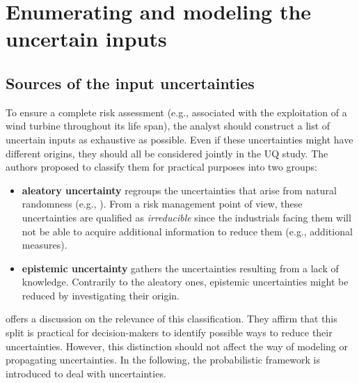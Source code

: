 \section{Enumerating and modeling the uncertain inputs}

\subsection{Sources of the input uncertainties}

To ensure a complete risk assessment (e.g., associated with the exploitation of a wind turbine throughout its life span), the analyst should construct a list of uncertain inputs as exhaustive as possible. 
Even if these uncertainties might have different origins, they should all be considered jointly in the UQ study. 
The authors proposed to classify them for practical purposes into two groups:
\begin{itemize}
    \item \textbf{aleatory uncertainty} regroups the uncertainties that arise from natural randomness (e.g., ). 
    From a risk management point of view, these uncertainties are qualified as \textit{irreducible} since the industrials facing them will not be able to acquire additional information to reduce them (e.g., additional measures).     
    \item \textbf{epistemic uncertainty} gathers the uncertainties resulting from a lack of knowledge. 
    Contrarily to the aleatory ones, epistemic uncertainties might be reduced by investigating their origin. 
\end{itemize} 

\citet{kiureghian_2009} offers a discussion on the relevance of this classification. 
They affirm that this split is practical for decision-makers to identify possible ways to reduce their uncertainties. 
However, this distinction should not affect the way of modeling or propagating uncertainties. 
In the following, the probabilistic framework is introduced to deal with uncertainties. 


